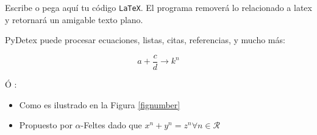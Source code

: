 Escribe o pega aquí tu código \texttt{LaTeX}. El programa removerá lo relacionado a latex y retornará un amigable texto plano. %

PyDetex puede procesar ecuaciones, listas, citas, referencias, y mucho más:

\begin{equation}
   a + \frac{c}{d} \longrightarrow k^n
\end{equation}

Ó :

\begin{itemize}[font=\bfseries]
   \item Como es ilustrado en la Figura \ref{fignumber}
   \item Propuesto por $\alpha$-Feltes \cite{feltes2008} dado que $x^n + y^n = z^n \forall n \in \mathcal{R}$
\end{itemize}